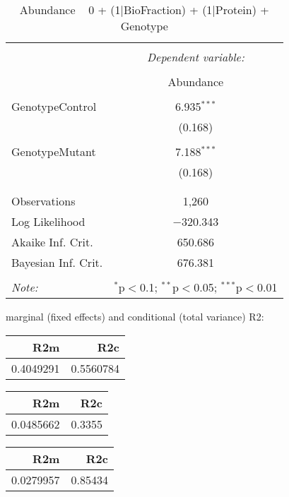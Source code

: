 \documentclass[11pt]{report}
\begin{document}
\begin{table}[!htbp] \centering 
  \caption{Abundance ~ 0 + (1|BioFraction) + (1|Protein) + Genotype} 
  \label{} 
\begin{tabular}{@{\extracolsep{5pt}}lc} 
\\[-1.8ex]\hline 
\hline \\[-1.8ex] 
 & \multicolumn{1}{c}{\textit{Dependent variable:}} \\ 
\cline{2-2} 
\\[-1.8ex] & Abundance \\ 
\hline \\[-1.8ex] 
 GenotypeControl & 6.935$^{***}$ \\ 
  & (0.168) \\ 
  & \\ 
 GenotypeMutant & 7.188$^{***}$ \\ 
  & (0.168) \\ 
  & \\ 
\hline \\[-1.8ex] 
Observations & 1,260 \\ 
Log Likelihood & $-$320.343 \\ 
Akaike Inf. Crit. & 650.686 \\ 
Bayesian Inf. Crit. & 676.381 \\ 
\hline 
\hline \\[-1.8ex] 
\textit{Note:}  & \multicolumn{1}{r}{$^{*}$p$<$0.1; $^{**}$p$<$0.05; $^{***}$p$<$0.01} \\ 
\end{tabular} 
\end{table} 
marginal (fixed effects) and conditional (total variance) R2:

\begin{tabular}{r|r}
\hline
R2m & R2c\\
\hline
0.4049291 & 0.5560784\\
\hline
\end{tabular}

\begin{tabular}{r|r}
\hline
R2m & R2c\\
\hline
0.0485662 & 0.3355\\
\hline
\end{tabular}

\begin{tabular}{r|r}
\hline
R2m & R2c\\
\hline
0.0279957 & 0.85434\\
\hline
\end{tabular}
\end{document}
